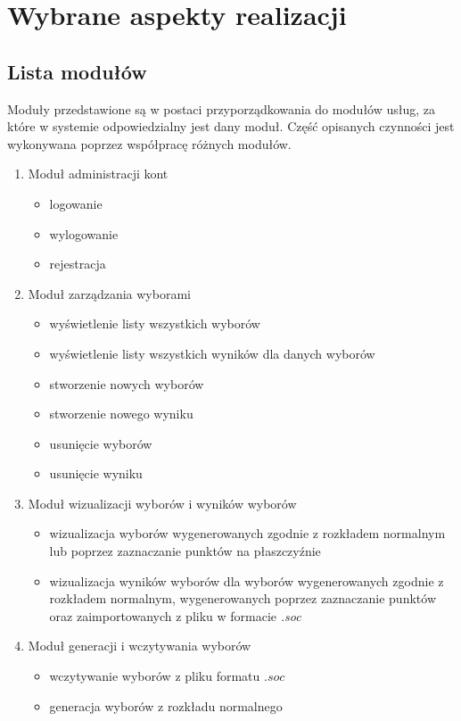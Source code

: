 \documentclass[polish,11pt]{aghthesis}
\begin{document}
\section{Wybrane aspekty realizacji}
\subsection{Lista modułów}
Moduły przedstawione są w postaci przyporządkowania do modułów usług, za które w
systemie odpowiedzialny jest dany moduł. Część opisanych czynności jest wykonywana
poprzez współpracę różnych modułów.

\noindent
\begin{enumerate}[leftmargin=0.5cm]
\item Moduł administracji kont
	\begin{itemize}
	\item logowanie
	\item wylogowanie
	\item rejestracja
	\end{itemize}
\item Moduł zarządzania wyborami
	\begin{itemize}
	\item wyświetlenie listy wszystkich wyborów
	\item wyświetlenie listy wszystkich wyników dla danych wyborów
	\item stworzenie nowych wyborów
	\item stworzenie nowego wyniku
	\item usunięcie wyborów
	\item usunięcie wyniku
	\end{itemize}
\item Moduł wizualizacji wyborów i wyników wyborów
	\begin{itemize}
	\item wizualizacja wyborów wygenerowanych zgodnie z rozkładem normalnym lub poprzez zaznaczanie 
	punktów na płaszczyźnie
	\item wizualizacja wyników wyborów dla wyborów wygenerowanych zgodnie z rozkładem normalnym, 	
	wygenerowanych poprzez zaznaczanie punktów oraz zaimportowanych z pliku w formacie \textit{.soc}
	\end{itemize}
\item Moduł generacji i wczytywania wyborów
	\begin{itemize}
	\item wczytywanie wyborów z pliku formatu $.soc$
	\item generacja wyborów z rozkładu normalnego

\end{itemize}
\end{enumerate}
\end{document}
